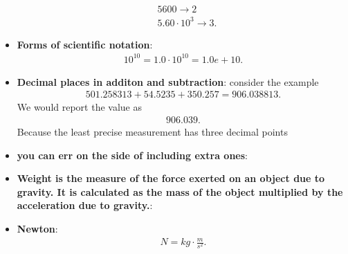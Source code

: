 \documentclass{report}
\begin{document}
\begin{itemize}
\begin{align*}
                &5600 \rightarrow 2 \\
                &5.60 \cdot 10^{3} \rightarrow 3
            .\end{align*}
        \item \textbf{Forms of scientific notation}: 
            \begin{align*}
                10^{10} = 1.0 \cdot 10^{10} = 1.0e+10
            .\end{align*}
        \item \textbf{Decimal places in additon and subtraction}: consider the example
            \begin{align*}
                501.258313 + 54.5235 + 350.257 = 906.038813
            .\end{align*}
            We would report the value as 
            \begin{align*}
                906.039
            .\end{align*}
            Because the least precise measurement has three decimal points
        \item \textbf{you can err on the side of including extra ones}:
        \item \textbf{Weight is the measure of the force exerted on an object due to gravity. It is calculated as the mass of the object multiplied by the acceleration due to gravity.}:
        \item \textbf{Newton}:
            \begin{align*}
                N = kg \cdot \frac{m}{s^{2}}
            .\end{align*}
    \end{itemize}

    \pagebreak 
\end{document}
